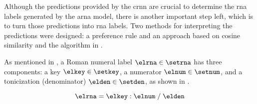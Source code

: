 
Although the predictions provided by the \gls{crnn} are
crucial to determine the \gls{rna} labels generated by the
\gls{arna} model, there is another important step left,
which is to turn those predictions into \gls{rna} labels.
Two methods for interpreting the predictions were designed:
a preference rule and an approach based on cosine similarity
and the algorithm in
.

As mentioned in
, a Roman
numeral label $\elrna \in \setrna$ has three components: a
key $\elkey \in \setkey$, a numerator $\elnum \in \setnum$,
and a tonicization (denominator) $\elden \in \setden$, as
shown in . 

\begin{equation}
    \label{eq:rna}
    \elrna = \elkey : \elnum \; / \; \elden
\end{equation}









